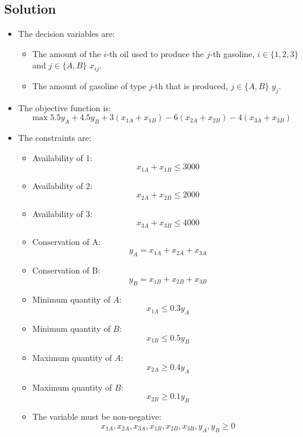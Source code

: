 \documentclass[12pt, a4paper]{report}
\newtheorem[style=M,bodystyle=\normalfont]{theorem}{Theorem}
\newtheorem[style=M,bodystyle=\normalfont]{corollary}{Corollary}
\newtheorem[style=M,bodystyle=\normalfont]{lemma}{Lemma}
\newtheorem[style=M,bodystyle=\normalfont]{definition}{Definition}
\begin{document}
    \subsection*{Solution}
        \begin{itemize}
            \item The decision variables are:
                \begin{itemize}
                    \item The amount of the $i$-th oil used to produce the $j$-th gasoline, $i \in \{1,2,3\}$ and $j \in \{A,B\}$ $x_{ij}$. 
                    \item The amount of gasoline of type $j$-th that is produced, $j \in \{A,B\}$ $y_j$. 
                \end{itemize}
            \item The objective function is: 
                \[\max{5.5y_A+4.5y_B+3(x_{1A}+x_{1B})-6(x_{2A}+x_{2B})-4(x_{3A}+x_{3B})}\]
            \item The constraints are:
                \begin{itemize}
                    \item Availability of 1: 
                        \[x_{1A}+x_{1B} \leq 3 000\]
                    \item Availability of 2:
                        \[x_{2A}+x_{2B} \leq 2 000\]
                    \item Availability of 3:  
                        \[x_{3A}+x_{3B} \leq 4 000\]
                    \item Conservation of A:
                        \[y_A=x_{1A}+x_{2A}+x_{3A}\]
                    \item Conservation of B:
                        \[y_B=x_{1B}+x_{2B}+x_{3B}\]
                    \item Minimum quantity of $A$: 
                        \[x_{1A} \leq 0.3y_A\]
                    \item Minimum quantity of $B$: 
                        \[x_{1B} \leq 0.5y_B\]
                    \item Maximum quantity of $A$: 
                        \[x_{2A} \geq 0.4y_A\]
                    \item Maximum quantity of $B$: 
                        \[x_{2B} \geq 0.1y_B\]
                    \item The variable must be non-negative: 
                        \[x_{1A},x_{2A},x_{3A},x_{1B},x_{2B},x_{3B},y_A,y_B \geq 0\]  
                \end{itemize}
        \end{itemize}
\end{document}
